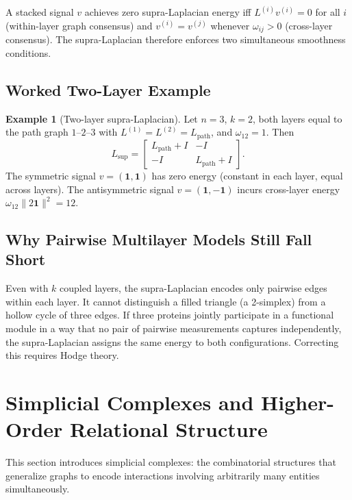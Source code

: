 \documentclass[11pt]{article}
\theoremstyle{definition}
\newtheorem{example}[theorem]{Example}
\theoremstyle{remark}
\newcommand{\Lsup}{L_{\mathrm{sup}}}
\begin{document}
A stacked signal $v$ achieves zero supra-Laplacian energy iff $L^{(i)}v^{(i)}=0$
for all $i$ (within-layer graph consensus) and $v^{(i)}=v^{(j)}$ whenever
$\omega_{ij}>0$ (cross-layer consensus). The supra-Laplacian therefore enforces
two simultaneous smoothness conditions.

\subsection{Worked Two-Layer Example}

\begin{example}[Two-layer supra-Laplacian]
\label{ex:supra}
Let $n=3$, $k=2$, both layers equal to the path graph $1$--$2$--$3$ with
$L^{(1)}=L^{(2)}=L_{\mathrm{path}}$, and $\omega_{12}=1$. Then
\[
  \Lsup = \begin{bmatrix} L_{\mathrm{path}}+I & -I \\ -I & L_{\mathrm{path}}+I \end{bmatrix}.
\]
The symmetric signal $v=(\mathbf{1},\mathbf{1})$ has zero energy (constant in
each layer, equal across layers). The antisymmetric signal
$v=(\mathbf{1},-\mathbf{1})$ incurs cross-layer energy
$\omega_{12}\|2\mathbf{1}\|^2=12$.
\end{example}

\subsection{Why Pairwise Multilayer Models Still Fall Short}

Even with $k$ coupled layers, the supra-Laplacian encodes only pairwise edges
within each layer. It cannot distinguish a filled triangle (a 2-simplex) from a
hollow cycle of three edges. If three proteins jointly participate in a functional module in a
way that no pair of pairwise measurements captures independently, the supra-Laplacian assigns the same energy
to both configurations. Correcting this requires Hodge theory.


\section{Simplicial Complexes and Higher-Order Relational Structure}
\label{sec:simplicial}

This section introduces simplicial complexes: the combinatorial structures that
generalize graphs to encode interactions involving arbitrarily many entities
simultaneously.
\end{document}
